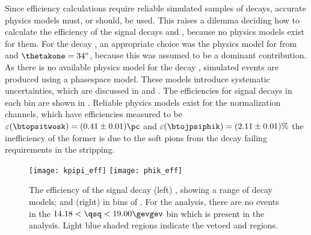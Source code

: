 Since efficiency calculations require reliable simulated samples of decays, accurate physics
models must, or should, be used.
This raises a dilemma deciding how to calculate the efficiency of the signal decays \btokpipimumu
and \btophikmumu, because no physics models exist for them.
For the decay \btokpipimumu, an appropriate choice
was the physics model for 
from  and $\thetakone=34^\circ$, because this was assumed to be a dominant
contribution.
As there is no available physics model for the decay \btophikmumu, simulated events are produced
using a phasespace model.
These models introduce systematic uncertainties, which are discussed in  and
.
The efficiencies for signal decays in each \qsq bin are shown in .
Reliable physics models exist for the normalization channels, which have efficiencies measured to
be $\varepsilon(\btopsitwosk)=(0.41\pm0.01)\pc$ and $\varepsilon(\btojpsiphik)=(2.11\pm0.01)\%$
the inefficiency of the former is due to the soft pions from the \psitwos decay failing \pt
requirements in the stripping.

\begin{figure}[t]
  \begin{center}
    \texttt{[image: kpipi\_eff]}
    \texttt{[image: phik\_eff]}
    \caption[Efficiency as a function of \qsq for \btokpipimumu and \btophikmumu]
    {
      The efficiency of the signal decay
      (left) \btokpipimumu, showing a range of decay models; and
      (right) \btophikmumu in bins of \qsq.
      For the \btophikmumu analysis, there are no events in the $14.18<\qsq<19.00\gevgev$ bin which
      is present in the \btokpipimumu analysis.
      Light blue shaded regions indicate the vetoed \jpsi and \psitwos regions.
    }
    \label{fig:hhh:effs}
  \end{center}
\end{figure}



